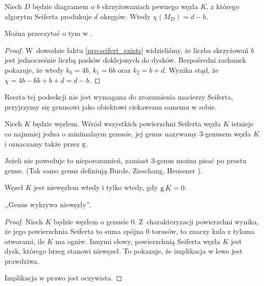 \begin{proposition}
\label{prp:seifert_euler_characteristics}%
    Niech $D$ będzie diagramem o $b$ skrzyżowaniach pewnego węzła $K$, z którego algorytm Seiferta produkuje $d$ okręgów.
    Wtedy $\chi(M_D) = d - b$.
\end{proposition}

Można przeczytać o tym w \cite[s. 82]{murasugi1996}.

\begin{proof}
    W~dowodzie faktu \ref{prp:seifert_exists} widzieliśmy, że liczba skrzyżowań $b$ jest jednocześnie liczbą pasków doklejonych do dysków.
    Bezpośredni rachunek pokazuje, że wtedy $k_0 = 4b$, $k_1 = 6b$ oraz $k_2 = b+d$.
    Wynika stąd, że $\chi = 4b - 6b + b + d = d - b$.
\end{proof}

Reszta tej podsekcji nie jest wymagana do zrozumienia macierzy Seiferta, przyjrzymy się genusowi jako obiektowi ciekawemu samemu w sobie.

\begin{definition}[3-genus]
    Niech $K$ będzie węzłem.
    Wśród wszystkich powierzchni Seiferta węzła $K$ istnieje co najmniej jedna o minimalnym genusie, jej genus nazywamy 3-genusem węzła $K$ i oznaczamy także przez $\operatorname{g}$.
\end{definition}

Jeżeli nie powoduje to nieporozumień, zamiast 3-genus można pisać po prostu genus.
(Tak samo genus definiują Burde, Zieschang, Heusener \cite[s. 20]{burde2014}).

\begin{proposition}
\label{prp:genus_detects_unknot}%
    Węzeł $K$ jest niewęzłem wtedy i tylko wtedy, gdy $\operatorname{g} K = 0$.
\end{proposition}

,,Genus wykrywa niewęzły''.

\begin{proof}
    Niech $K$ będzie węzłem o genusie $0$.
    Z~charakteryzacji powierzchni wynika, że jego powierzchnia Seiferta to suma spójna $0$ torusów, to znaczy kula z tyloma otworami, ile $K$ ma ogniw.
    Innymi słowy, powierzchnią Seiferta węzła $K$ jest dysk, którego brzeg stanowi niewęzeł.
    To pokazuje, że implikacja w lewo jest prawdziwa.

    Implikacja w prawo jest oczywista.
\end{proof}









%


